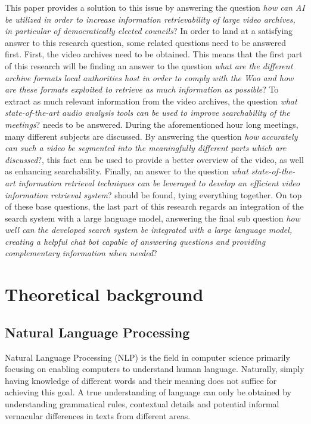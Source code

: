 \documentclass[twoside]{uva-inf-bachelor-thesis}
\begin{document}
This paper provides a solution to this issue by answering the question \textit{how can AI be utilized in order to increase information retrievability of large video archives, in particular of democratically elected councils}? In order to land at a satisfying answer to this research question, some related questions need to be answered first. 
First, the video archives need to be obtained. This means that the first part of this research will be finding an answer to the question \textit{what are the different archive formats local authorities host in order to comply with the Woo and how are these formats exploited to retrieve as much information as possible}?
To extract as much relevant information from the video archives, the question \textit{what state-of-the-art audio analysis tools can be used to improve searchability of the meetings}? needs to be answered. During the aforementioned hour long meetings, many different subjects are discussed. By answering the question \textit{how accurately can such a video be segmented into the meaningfully different parts which are discussed}?, this fact can be used to provide a better overview of the video, as well as enhancing searchability. Finally, an answer to the question \textit{what state-of-the-art information retrieval techniques can be leveraged to develop an efficient video information retrieval system}? should be found, tying everything together.
On top of these base questions, the last part of this research regards an integration of the search system with a large language model, answering the final sub question \textit{how well can the developed search system be integrated with a large language model, creating a helpful chat bot capable of answering questions and providing complementary information when needed}?

\chapter{Theoretical background}

\section{Natural Language Processing}
Natural Language Processing (NLP) is the field in computer science primarily focusing on enabling computers to understand human language. Naturally, simply having knowledge of different words and their meaning does not suffice for achieving this goal. A true understanding of language can only be obtained by understanding grammatical rules, contextual details and potential informal vernacular differences in texts from different areas.
\end{document}
